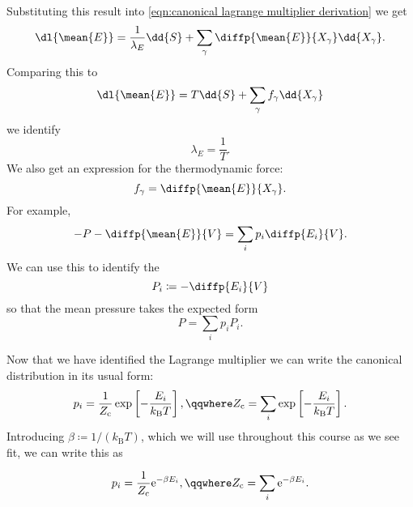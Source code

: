 \documentclass[fleqn]{NotesClass}
\newcommand*{\boltzmann}{k_{\mathrm{B}}}
\newcommand*{\cpartition}{Z_{\mathrm{c}}}
\newcommand*{\e}{\mathrm{e}}
\begin{document}
    Substituting this result into \cref{eqn:canonical lagrange multiplier derivation} we get
    \begin{equation}
        \dl{\mean{E}} = \frac{1}{\lambda_E} \dd{S} + \sum_\gamma \diffp{\mean{E}}{X_\gamma} \dd{X_\gamma}.
    \end{equation}
    Comparing this to
    \begin{equation}
        \dl{\mean{E}} = T \dd{S} + \sum_\gamma f_\gamma \dd{X_\gamma}
    \end{equation}
    we identify
    \begin{equation}
        \lambda_E = \frac{1}{T}.
    \end{equation}
    We also get an expression for the thermodynamic force:
    \begin{equation}\label{eqn: f = dE/dX}
        f_\gamma = \diffp{\mean{E}}{X_\gamma}.
    \end{equation}
    For example,
    \begin{equation}
        -P - \diffp{\mean{E}}{V} = \sum_i p_i \diffp{E_i}{V}.
    \end{equation}
    We can use this to identify the 
    \begin{equation}
        P_i \coloneqq - \diffp{E_i}{V}
    \end{equation}
    so that the mean pressure takes the expected form
    \begin{equation}
        P = \sum_i p_i P_i.
    \end{equation}
    
    Now that we have identified the Lagrange multiplier we can write the canonical distribution in its usual form:
    \begin{equation}
        p_i = \frac{1}{\cpartition} \exp\left[ -\frac{E_i}{\boltzmann T} \right], \qqwhere \cpartition = \sum_i \exp\left[ -\frac{E_i}{\boltzmann T} \right].
    \end{equation}
    Introducing \(\beta \coloneqq 1/(\boltzmann T)\), which we will use throughout this course as we see fit, we can write this as
    \begin{important}
        \vspace{-2.5ex}
        \begin{equation}
            p_i = \frac{1}{\cpartition} \e^{-\beta E_i}, \qqwhere \cpartition = \sum_i \e^{-\beta E_i}.
        \end{equation}
    \end{important}
    
\end{document}
